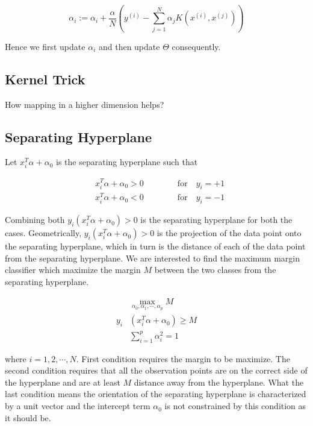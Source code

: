 \documentclass[11pt]{article}
\theoremstyle{definition}
\begin{document}
$$
\alpha_i := \alpha_i + \frac{\alpha}{N} \left(y^{(i)} - \sum_{j=1}^N \alpha_j K(x^{(i)}, x^{(j)})\right)
$$


Hence we first update $\alpha_i$ and then update $\Theta$ consequently. 


\subsection{Kernel Trick }

How mapping in a higher dimension helps?


\subsection{Separating Hyperplane }

Let $x_i^T\alpha + \alpha_0$ is the separating hyperplane such that 

$$
\begin{align}\nonumber
& x_i^T\alpha + \alpha_0 > 0 \qquad\qquad \text{for}\quad y_i = +1 \\ 
& x_i^T\alpha + \alpha_0 < 0 \qquad\qquad \text{for}\quad y_i = -1 
\end{align}
$$


Combining both $y_i(x_i^T\alpha + \alpha_0)>0$ is the separating hyperplane for both the cases.  Geometrically, $y_i(x_i^T\alpha + \alpha_0)>0$  is the projection of the data point onto the separating hyperplane, which in turn is the distance of each of the data point from the separating hyperplane. We are interested to find the maximum margin classifier which maximize the margin $M$ between the two classes from the separating hyperplane. 


$$
\begin{align}\nonumber
& \max_{\alpha_0, \alpha_1, \cdots, \alpha_p} M  \\ \nonumber
 y_i & (x_i^T\alpha + \alpha_0) \geqslant M \\
& \sum_{i=1}^p \alpha_i^2 = 1
\end{align}
$$


where $i = 1, 2, \cdots, N$. First condition requires the margin to be maximize. The second condition requires that all the observation points are on the correct side of the hyperplane and are at least $M$ distance away from the hyperplane. What the last condition means the orientation of the separating hyperplane is characterized by a unit vector and the intercept term $\alpha_0$ is not constrained by this condition as it should be. 
\end{document}

